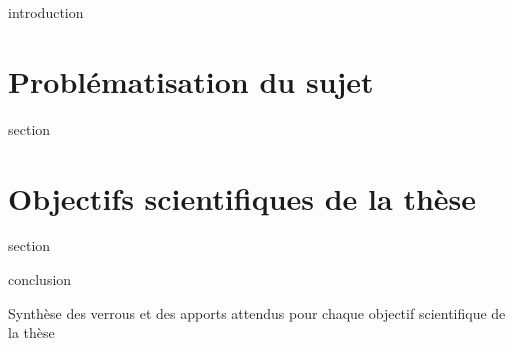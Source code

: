 \chaptertoc{}

\label{sec:2-int}
{introduction}

\section{Problématisation du sujet}
\label{sec:2-1}
{section}

\section{Objectifs scientifiques de la thèse}
\label{sec:2-2}
{section}

\label{sec:2-cnc}
{conclusion}

\begin{landscape}
  \vspace*{\fill}
  \begin{table}[htp!]
    \centering
    
    \caption{Synthèse des verrous et des apports attendus pour chaque
      objectif scientifique de la thèse}
    \label{tab:synthese_objectifs}
  \end{table}
  \vspace*{\fill}
\end{landscape}

